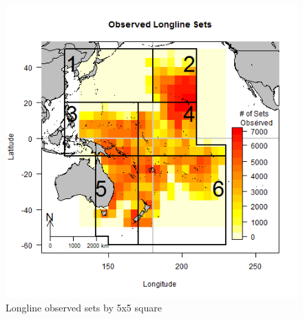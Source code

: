 \documentclass[12pt]{SCreport}
\begin{document}
\begin{figure}
\begin{center}
\includegraphics[scale=0.95]{../GRAPHICS/Defined/FIG_03_obs_ll_sets}
\caption{\label{fig:regions} Longline observed sets by 5x5 square}
\end{center}
\end{figure}
\end{document}
